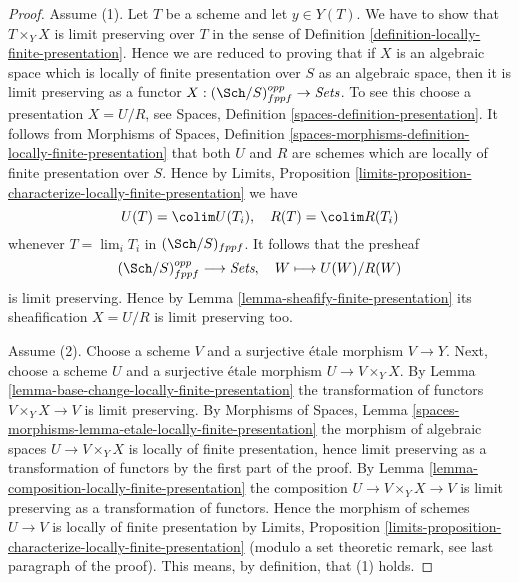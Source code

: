 \begin{proof}
Assume (1). Let $T$ be a scheme and let $y \in Y(T)$. We have to show that
$T \times_Y X$ is limit preserving over $T$ in the sense of
Definition \ref{definition-locally-finite-presentation}.
Hence we are reduced to proving that if $X$ is an algebraic space which
is locally of finite presentation over $S$ as an algebraic space, then it
is limit preserving as a functor
$X : (\Sch/S)_{fppf}^{opp} \to \textit{Sets}$.
To see this choose a presentation $X = U/R$, see
Spaces, Definition \ref{spaces-definition-presentation}.
It follows from
Morphisms of Spaces,
Definition \ref{spaces-morphisms-definition-locally-finite-presentation}
that both $U$ and $R$ are schemes which are locally of finite presentation
over $S$. Hence by
Limits, Proposition
\ref{limits-proposition-characterize-locally-finite-presentation}
we have
$$
U(T) = \colim U(T_i), \quad
R(T) = \colim R(T_i)
$$
whenever $T = \lim_i T_i$ in $(\Sch/S)_{fppf}$. It follows
that the presheaf
$$
(\Sch/S)_{fppf}^{opp} \longrightarrow \textit{Sets}, \quad
W \longmapsto U(W)/R(W)
$$
is limit preserving. Hence by
Lemma \ref{lemma-sheafify-finite-presentation}
its sheafification $X = U/R$ is limit preserving too.

\medskip\noindent
Assume (2). Choose a scheme $V$ and a surjective \'etale morphism
$V \to Y$. Next, choose a scheme $U$ and a surjective \'etale morphism
$U \to V \times_Y X$. By
Lemma \ref{lemma-base-change-locally-finite-presentation}
the transformation of functors $V \times_Y X \to V$ is limit preserving. By
Morphisms of Spaces,
Lemma \ref{spaces-morphisms-lemma-etale-locally-finite-presentation}
the morphism of algebraic spaces $U \to V \times_Y X$ is locally
of finite presentation, hence limit preserving as
a transformation of functors by the first part of the proof. By
Lemma \ref{lemma-composition-locally-finite-presentation}
the composition $U \to V \times_Y X \to V$ is limit preserving
as a transformation of functors. Hence
the morphism of schemes $U \to V$ is locally of finite presentation by
Limits, Proposition
\ref{limits-proposition-characterize-locally-finite-presentation}
(modulo a set theoretic remark, see last paragraph of the proof).
This means, by definition, that (1) holds.


\end{proof}
